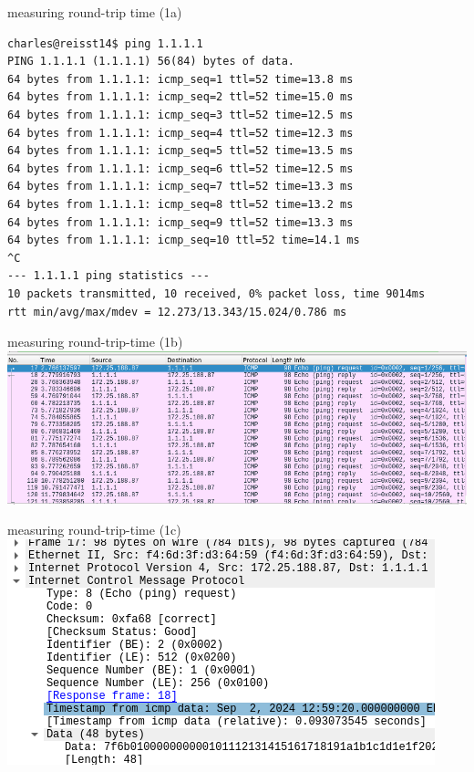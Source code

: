 \begin{frame}[fragile]{measuring round-trip time (1a)}
\begin{Verbatim}[fontsize=\fontsize{10}{11}]
charles@reisst14$ ping 1.1.1.1
PING 1.1.1.1 (1.1.1.1) 56(84) bytes of data.
64 bytes from 1.1.1.1: icmp_seq=1 ttl=52 time=13.8 ms
64 bytes from 1.1.1.1: icmp_seq=2 ttl=52 time=15.0 ms
64 bytes from 1.1.1.1: icmp_seq=3 ttl=52 time=12.5 ms
64 bytes from 1.1.1.1: icmp_seq=4 ttl=52 time=12.3 ms
64 bytes from 1.1.1.1: icmp_seq=5 ttl=52 time=13.5 ms
64 bytes from 1.1.1.1: icmp_seq=6 ttl=52 time=12.5 ms
64 bytes from 1.1.1.1: icmp_seq=7 ttl=52 time=13.3 ms
64 bytes from 1.1.1.1: icmp_seq=8 ttl=52 time=13.2 ms
64 bytes from 1.1.1.1: icmp_seq=9 ttl=52 time=13.3 ms
64 bytes from 1.1.1.1: icmp_seq=10 ttl=52 time=14.1 ms
^C
--- 1.1.1.1 ping statistics ---
10 packets transmitted, 10 received, 0% packet loss, time 9014ms
rtt min/avg/max/mdev = 12.273/13.343/15.024/0.786 ms
\end{Verbatim}
\end{frame}

\begin{frame}[fragile]{measuring round-trip-time (1b)}
\includegraphics[width=\textwidth]{../perf/icmp-ping-pkts}
\end{frame}

\begin{frame}[fragile]{measuring round-trip-time (1c)}
\includegraphics[width=\textwidth]{../perf/icmp-ping-pkt-example}
\end{frame}

